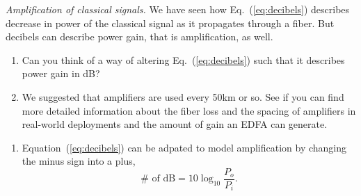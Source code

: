 \begin{exercise}
\emph{Amplification of classical signals.} We have seen how Eq.~(\ref{eq:decibels}) describes decrease in power of the classical signal as it propagates through a fiber. But decibels can describe power gain, that is amplification, as well.
\begin{enumerate}[label=\alph*]
    \item Can you think of a way of altering Eq.~(\ref{eq:decibels}) such that it describes power gain in dB?
    \item We suggested that amplifiers are used every 50km or so.  See if you can find more detailed information about the fiber loss and the spacing of amplifiers in real-world deployments and the amount of gain an EDFA can generate.
\end{enumerate}  
\end{exercise}
\begin{solution}
\begin{enumerate}[label=(\alph*)]
    \item Equation~(\ref{eq:decibels}) can be adpated to model amplification by changing the minus sign into a plus,
    \begin{equation*}
        \# \text { of } \mathrm{dB} = 10 \log _{10} \frac{P_o}{P_i}.
    \end{equation*}
\end{enumerate}
\end{solution}